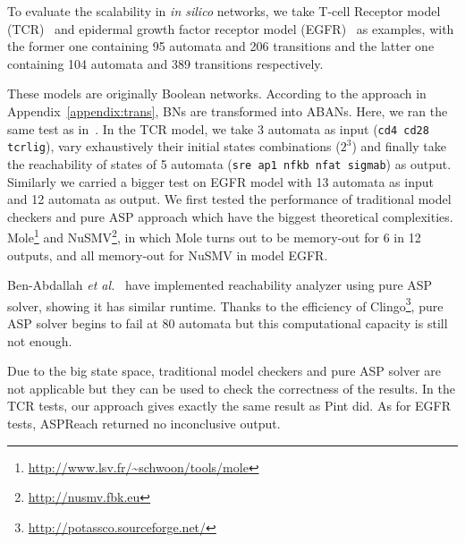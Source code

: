 To evaluate the scalability in \textit{in silico} networks, we take T-cell Receptor model (TCR)~\cite{saez2007logical} and epidermal growth factor receptor model (EGFR)~\cite{samaga2009logic} as examples, with the former one containing 95 automata and 206 transitions and the latter one containing 104 automata and 389 transitions respectively. 

These models are originally Boolean networks.
According to the approach in Appendix~\ref{appendix:trans}, BNs are transformed into ABANs. 
Here, we ran the same test as in~\cite{folschette2015}. In the TCR model, we take 3 automata as input (\texttt{cd4 cd28 tcrlig}), vary exhaustively their initial states combinations ($2^3$) and finally take the reachability of states of 5 automata (\texttt{sre ap1 nfkb nfat sigmab}) as output. 
Similarly we carried a bigger test on EGFR model with 13 automata %
as input and 12 automata %
as output.
We first tested the performance of traditional model checkers and pure ASP approach which have the biggest theoretical complexities. 
Mole\footnote{\url{http://www.lsv.fr/~schwoon/tools/mole}} and NuSMV\footnote{\url{http://nusmv.fbk.eu}}, in which Mole turns out to be memory-out for 6 in 12 outputs, and all memory-out for NuSMV in model EGFR. 

Ben-Abdallah \textit{et al.}~\cite{abdallah2015exhaustive} have implemented reachability analyzer using pure ASP solver, showing it has similar runtime.
Thanks to the efficiency of Clingo\footnote{\url{http://potassco.sourceforge.net/}}, pure ASP solver begins to fail at 80 automata but this computational capacity is still not enough.

Due to the big state space, traditional model checkers and pure ASP solver are not applicable but they can be used to check the correctness of the results.
In the TCR tests, our approach gives exactly the same result as Pint did. 
As for EGFR tests, ASPReach returned no inconclusive output.

